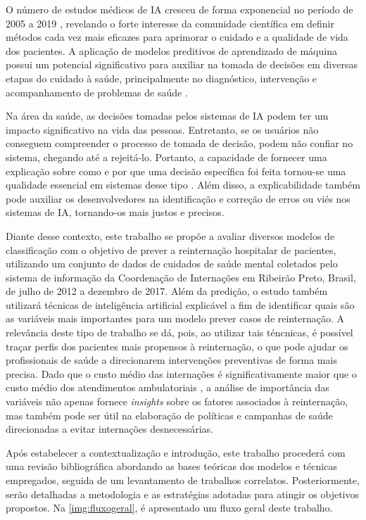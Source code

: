 O número de estudos médicos de IA cresceu de forma exponencial no período de 2005 a 2019 \cite{ShortGuide2020}, revelando o forte interesse da comunidade científica em definir métodos cada vez mais eficazes para aprimorar o cuidado e a qualidade de vida dos pacientes. A aplicação de modelos preditivos de aprendizado de máquina possui um potencial significativo para auxiliar na tomada de decisões em diversas etapas do cuidado à saúde, principalmente no diagnóstico, intervenção e acompanhamento de problemas de saúde \cite{obermeyer2017}.

Na área da saúde, as decisões tomadas pelos sistemas de IA podem ter um impacto significativo na vida das pessoas. Entretanto, se os usuários não conseguem compreender o processo de tomada de decisão, podem não confiar no sistema, chegando até a rejeitá-lo. Portanto, a capacidade de fornecer uma explicação sobre como e por que uma decisão específica foi feita tornou-se uma qualidade essencial em sistemas desse tipo \cite{WagnerBenedikt2021Ahpo}. Além disso, a explicabilidade também pode auxiliar os desenvolvedores na identificação e correção de erros ou viés nos sistemas de IA, tornando-os mais justos e precisos.

Diante desse contexto, este trabalho se propõe a avaliar diversos modelos de classificação com o objetivo de prever a reinternação hospitalar de pacientes, utilizando um conjunto de dados de cuidados de saúde mental coletados pelo sistema de informação da Coordenação de Internações em Ribeirão Preto, Brasil, de julho de 2012 a dezembro de 2017. Além da predição, o estudo também utilizará técnicas de inteligência artificial explicável a fim de identificar quais são as variáveis mais importantes para um modelo prever casos de reinternação. A relevância deste tipo de trabalho se dá, pois, ao utilizar tais téncnicas, é possível traçar perfis dos pacientes mais propensos à reinternação, o que pode ajudar os profissionais de saúde a direcionarem intervenções preventivas de forma mais precisa. Dado que o custo médio das internações é significativamente maior que o custo médio dos atendimentos ambulatoriais \cite{cesconetto2008}, a análise de importância das variáveis não apenas fornece \textit{insights} sobre os fatores associados à reinternação, mas também pode ser útil na elaboração de políticas e campanhas de saúde direcionadas a evitar internações desnecessárias.

Após estabelecer a contextualização e introdução, este trabalho procederá com uma revisão bibliográfica abordando as bases teóricas dos modelos e técnicas empregados, seguida de um levantamento de trabalhos correlatos. Posteriormente, serão detalhadas a metodologia e as estratégias adotadas para atingir os objetivos propostos. Na \autoref{img:fluxogeral}, é apresentado um fluxo geral deste trabalho.


